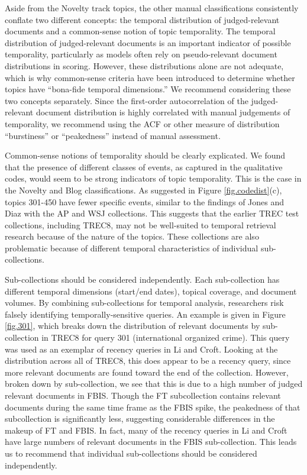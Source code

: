 \documentclass{sig-alternate}
\begin{document}
Aside from the Novelty track topics, the other manual classifications consistently conflate two different concepts: the temporal distribution of judged-relevant documents and a common-sense notion of topic temporality. The temporal distribution of judged-relevant documents is an important indicator of possible temporality, particularly as models often rely on pseudo-relevant document distributions in scoring. However, these distributions alone are not adequate, which is why common-sense criteria have been introduced to determine whether topics have ``bona-fide temporal dimensions.'' We recommend considering these two concepts separately.  Since the first-order autocorrelation of the judged-relevant document distribution is highly correlated with manual judgements of temporality, we recommend using the ACF or other measure of distribution ``burstiness'' or ``peakedness'' instead of manual assessment.  

Common-sense notions of temporality should be clearly explicated.  We found that the presence of different classes of events, as captured in the qualitative codes, would seem to be strong indicators of topic temporality.  This is the case in the Novelty and Blog classifications. As suggested in Figure \ref{fig.codedist}(c), topics 301-450 have fewer specific events, similar to the findings of Jones and Diaz with the AP and WSJ collections. This suggests that the earlier TREC test collections, including TREC8, may not be well-suited to temporal retrieval research because of the nature of the topics. These collections are also problematic because of different temporal characteristics of individual sub-collections.

Sub-collections should be considered independently. Each sub-collection has different temporal dimensions (start/end dates), topical coverage, and document volumes. By combining sub-collections for temporal analysis, researchers risk falsely identifying temporally-sensitive queries. An example is given in Figure \ref{fig.301}, which breaks down the distribution of relevant documents by sub-collection in TREC8 for query 301 (international organized crime). This query was used as an exemplar of recency queries in Li and Croft. Looking at the distribution across all of TREC8, this does appear to be a recency query, since more relevant documents are found toward the end of the collection. However, broken down by sub-collection, we see that this is due to a high number of judged relevant documents in FBIS. Though the FT subcollection contains relevant documents during the same time frame as the FBIS spike, the peakedness of that subcollection is significantly less, suggesting considerable differences in the makeup of FT and FBIS. In fact, many of the recency queries in Li and Croft have large numbers of relevant documents in the FBIS sub-collection.    This leads us to recommend that individual sub-collections should be considered independently.
\end{document}
